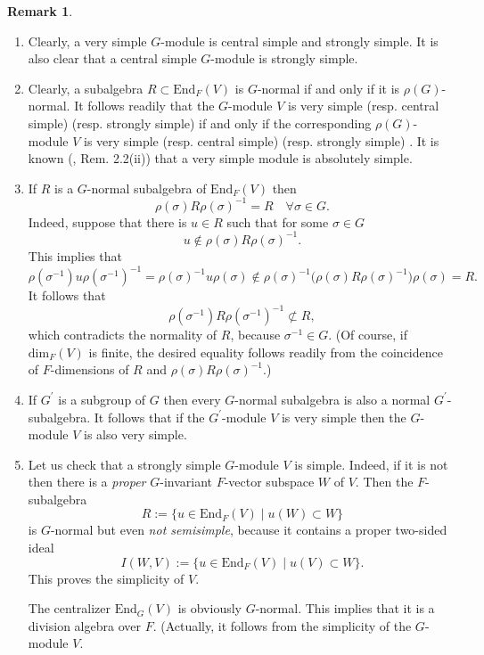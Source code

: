 \documentclass[12pt,a4paper,reqno]{amsart}
\def\End{\mathrm{End}}
\def\dim{\mathrm{dim}}
\theoremstyle{definition}
\newtheorem{rem}[thm]{Remark}
\begin{document}
\begin{rem}
\label{image}
\begin{enumerate}
\item[(0)]
Clearly, a very simple $G$-module is central simple and strongly simple. It is also clear that
a central simple $G$-module is strongly simple.


\item[(i)]
 Clearly,  a subalgebra $R \subset \End_F(V)$ is $G$-normal  if and only if it is $\rho(G)$-normal. It follows readily that
 the $G$-module $V$ is very simple (resp. central simple) (resp. strongly simple) if and only if the corresponding $\rho(G)$-module $V$ is very simple (resp. central simple)  (resp. strongly simple) . 
 It is known (\cite{ZarhinM}, Rem. 2.2(ii)) that a very simple module is absolutely simple.
 \item[(ii)] If $R$ is a $G$-normal subalgebra of $\End_F(V)$ then
$$\rho(\sigma) R \rho(\sigma)^{-1} = R \quad \forall
 \sigma \in G.$$
 Indeed, suppose that there is $u \in R$ such that for some $\sigma \in G$
 $$u \not\in \rho(\sigma) R \rho(\sigma)^{-1}.$$
 This implies that
 $$ \rho(\sigma^{-1}) u  \rho(\sigma^{-1})^{-1}=
 \rho(\sigma)^{-1}u \rho(\sigma)
  \not\in  \rho(\sigma)^{-1}\big(\rho(\sigma) R \rho(\sigma)^{-1}\big)\rho(\sigma)=R.$$
  It follows that
  $$ \rho(\sigma^{-1}) R  \rho(\sigma^{-1})^{-1}\not\subset R,$$
  which contradicts the normality of $R$, because $\sigma^{-1}\in G$. (Of course, if $\dim_F(V)$ is finite, the desired equality follows readily from the coincidence of $F$-dimensions of $R$ and 
 $\rho(\sigma) R \rho(\sigma)^{-1}$.)
 \item[(iii)]
If $G^{\prime}$ is a subgroup of $G$ then every $G$-normal subalgebra is also a normal $G^{\prime}$-subalgebra. It follows that
 if the $G^{\prime}$-module $V$ is very simple then the $G$-module $V$ is also very simple.
 \item[(iv)]
Let us check that a strongly simple $G$-module $V$ is simple. Indeed, if it is not then there is a {\sl proper} $G$-invariant $F$-vector subspace $W$ of $V$. Then
 the $F$-subalgebra
 $$R:=\{u \in \End_F(V)\mid u(W) \subset W\}$$
 is $G$-normal but  even {\sl not semisimple}, because it contains a proper two-sided ideal
 $$I(W,V):= \{u \in \End_F(V)\mid u(V) \subset W\}.$$
 This proves the simplicity of $V$.  
 
The centralizer $\End_G(V)$ is obviously $G$-normal. This implies that it is a division algebra over $F$.
(Actually, it follows from the simplicity of the $G$-module $V$.
 

\end{enumerate}
\end{rem}
\end{document}
